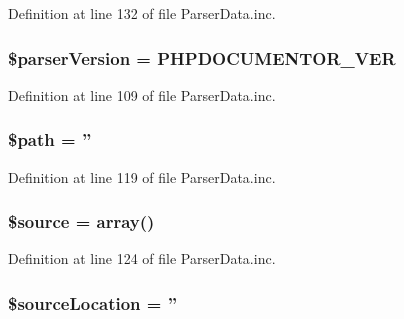 \-Definition at line 132 of file \-Parser\-Data.\-inc.

\hypertarget{classparser_page_a6a78577583114ac061a3fba3350fd4df}{
\subsubsection[{\$parser\-Version}]{\setlength{\rightskip}{0pt plus 5cm}\$parser\-Version = {\bf \-P\-H\-P\-D\-O\-C\-U\-M\-E\-N\-T\-O\-R\-\_\-\-V\-E\-R}}}\label{classparser_page_a6a78577583114ac061a3fba3350fd4df}


\-Definition at line 109 of file \-Parser\-Data.\-inc.

\hypertarget{classparser_page_a0a4baf0b22973c07685c3981f0d17fc4}{
\subsubsection[{\$path}]{\setlength{\rightskip}{0pt plus 5cm}\$path = ''}}\label{classparser_page_a0a4baf0b22973c07685c3981f0d17fc4}


\-Definition at line 119 of file \-Parser\-Data.\-inc.

\hypertarget{classparser_page_a99a2b085f0a29bd5d799fdcbb63d261b}{
\subsubsection[{\$source}]{\setlength{\rightskip}{0pt plus 5cm}\$source = array()}}\label{classparser_page_a99a2b085f0a29bd5d799fdcbb63d261b}


\-Definition at line 124 of file \-Parser\-Data.\-inc.

\hypertarget{classparser_page_a998b4c54041db5cd50185166322ad3ca}{
\subsubsection[{\$source\-Location}]{\setlength{\rightskip}{0pt plus 5cm}\$source\-Location = ''}}\label{classparser_page_a998b4c54041db5cd50185166322ad3ca}


